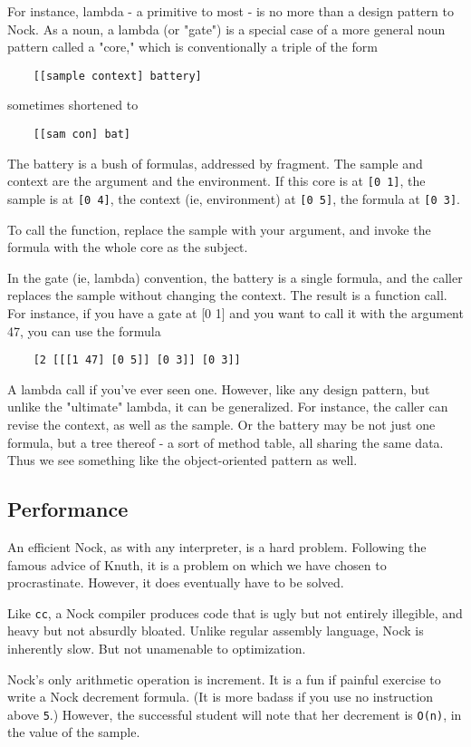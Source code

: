 \documentclass[10pt, nocopyrightspace]{sigplanconf}
\begin{document}
For instance, lambda - a primitive to most - is no more than a
design pattern to Nock.  As a noun, a lambda (or "gate") is a
special case of a more general noun pattern called a "core," 
which is conventionally a triple of the form
\begin{verbatim}
    [[sample context] battery]
\end{verbatim}
sometimes shortened to
\begin{verbatim}
    [[sam con] bat]
\end{verbatim}
The battery is a bush of formulas, addressed by fragment.  The
sample and context are the argument and the environment.  If this
core is at \verb|[0 1]|, the sample is at \verb|[0 4]|, the context (ie,
environment) at \verb|[0 5]|, the formula at \verb|[0 3]|.

To call the function, replace the sample with your argument, and
invoke the formula with the whole core as the subject.

In the gate (ie, lambda) convention, the battery is a single
formula, and the caller replaces the sample without changing the
context.  The result is a function call.  For instance, if you
have a gate at [0 1] and you want to call it with the argument
47, you can use the formula
\begin{verbatim}
    [2 [[[1 47] [0 5]] [0 3]] [0 3]]
\end{verbatim}
A lambda call if you've ever seen one.  However, like any design
pattern, but unlike the "ultimate" lambda, it can be generalized.
For instance, the caller can revise the context, as well as the
sample.  Or the battery may be not just one formula, but a tree
thereof - a sort of method table, all sharing the same data.
Thus we see something like the object-oriented pattern as well.

\subsection{Performance}

An efficient Nock, as with any interpreter, is a hard problem.
Following the famous advice of Knuth, it is a problem on which
we have chosen to procrastinate.  However, it does eventually
have to be solved.

Like \verb|cc|, a Nock compiler produces code that is ugly but not
entirely illegible, and heavy but not absurdly bloated.  Unlike
regular assembly language, Nock is inherently slow.  But not
unamenable to optimization.

Nock's only arithmetic operation is increment.  It is a fun if
painful exercise to write a Nock decrement formula.  (It is more
badass if you use no instruction above \verb|5|.) However, the
successful student will note that her decrement is \verb|O(n)|, in the
value of the sample.
\end{document}

